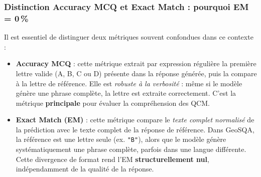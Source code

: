\documentclass[12pt,a4paper]{article}
\begin{document}
\subsubsection{Distinction Accuracy MCQ et Exact Match : pourquoi EM = 0\,\%}
\label{sec:em_clarification}

Il est essentiel de distinguer deux métriques souvent confondues dans ce contexte :

\begin{itemize}[leftmargin=*]
  \item \textbf{Accuracy MCQ} : cette métrique extrait par expression régulière la
  première lettre valide (A, B, C ou D) présente dans la réponse générée, puis la
  compare à la lettre de référence. Elle est \emph{robuste à la verbosité} : même
  si le modèle génère une phrase complète, la lettre est extraite correctement.
  C'est la métrique \textbf{principale} pour évaluer la compréhension des QCM.

  \item \textbf{Exact Match (EM)} : cette métrique compare le \emph{texte complet
  normalisé} de la prédiction avec le texte complet de la réponse de référence.
  Dans GeoSQA, la référence est une lettre seule (ex. \texttt{"B"}), alors que le
  modèle génère systématiquement une phrase complète, parfois dans une langue
  différente. Cette divergence de format rend l'EM \textbf{structurellement nul},
  indépendamment de la qualité de la réponse.
\end{itemize}
\end{document}
